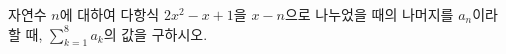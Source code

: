 자연수 $n$에 대하여 다항식 $2x^2-x+1$을 $x-n$으로 나누었을 때의 나머지를 $a_n$이라 할 때, $\displaystyle\sum_{k=1}^{8}a_k$의 값을 구하시오.
